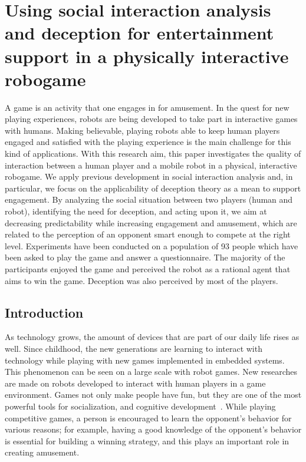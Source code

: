 \chapter{Using social interaction analysis and deception for entertainment support in a physically interactive robogame}\label{ch:deception}

A game is an activity that one engages in for amusement. In the quest for new playing experiences, robots are being developed to take part in interactive games with humans. Making believable, playing robots able to keep human players engaged and satisfied with the playing experience is the main challenge for this kind of applications. 
With this research aim, this paper investigates the quality of interaction between a human player and a mobile robot in a physical, interactive robogame. We apply previous development in social interaction analysis and, in particular, we focus on the applicability of deception theory as a mean to support engagement. By analyzing the social situation between two players (human and robot), identifying the need for deception, and acting upon it, we aim at decreasing predictability while increasing engagement and amusement, which are related to the perception of an opponent smart enough to compete at the right level. Experiments have been conducted on a population of 93 people which have been asked to play the game and answer a questionnaire. The majority of the participants enjoyed the game and perceived the robot as a rational agent that aims to win the game. Deception was also perceived by most of the players.

\section{Introduction}

As technology grows, the amount of devices that are part of our daily life rises as well. Since childhood, the new generations are learning to interact with technology while playing with new games implemented in embedded systems. This phenomenon can be seen on a large scale with robot games. New researches are made on robots developed to interact with human players in a game environment. Games not only make people have fun, but they are one of the most powerful tools for socialization, and cognitive development~\cite{vygotsky_play_1967, bruner_play:_1976, piaget_play_2013}.  While playing competitive games, a person is encouraged to learn the opponent's behavior for various reasons; for example, having a good knowledge of the opponent's behavior is essential for building a winning strategy, and this plays an important role in creating amusement.

